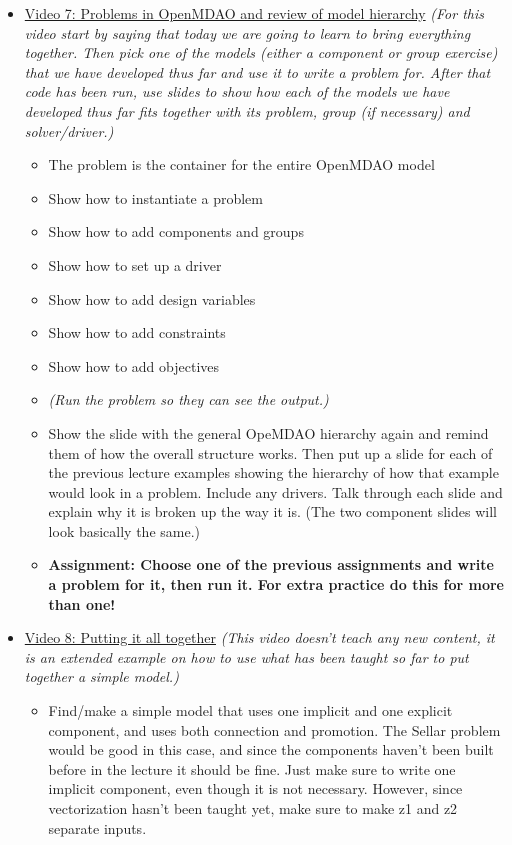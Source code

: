 \documentclass[12pt, letterpaper]{article}
\begin{document}
\begin{itemize}
	\item \underline{Video 7: Problems in OpenMDAO and review of model hierarchy} \textit{(For this video start by saying that today we are going to 	learn to bring everything together. Then pick one of the models (either a component or group exercise) that we have developed thus far and use it to write a problem for. After that code has been run, use slides to show how each of the models we have developed thus far fits together with its 			problem, group (if necessary) and solver/driver.)}
		\begin{itemize}
			\item The problem is the container for the entire OpenMDAO model
			\item Show how to instantiate a problem
			\item Show how to add components and groups
			\item Show how to set up a driver
			\item Show how to add design variables
			\item Show how to add constraints
			\item Show how to add objectives
			\item \textit{(Run the problem so they can see the output.)}
			\item Show the slide with the general OpeMDAO hierarchy again and remind them of how the overall structure works. Then put up a slide 					for each of the previous lecture examples showing the hierarchy of how that example would look in a problem. Include any drivers. Talk 					through each slide and explain why it is broken up the way it is. (The two component slides will look basically the same.)
			\item \textbf{Assignment: Choose one of the previous assignments and write a problem for it, then run it. For extra practice do this for 						more than one!}
		\end{itemize}
	\item \underline{Video 8: Putting it all together} \textit{(This video doesn’t teach any new content, it is an extended example on how to use what has been taught so far to put together a simple model.)}
		\begin{itemize}
			\item Find/make a simple model that uses one implicit and one explicit component, and uses both connection and promotion. The Sellar problem would be good in this case, and since the components haven’t been built before in the lecture it should be fine. Just make sure to write one implicit component, even though it is not necessary. However, since vectorization hasn’t been taught yet, make sure to make z1 and z2 separate inputs.

\end{itemize}
\end{itemize}
\end{document}
